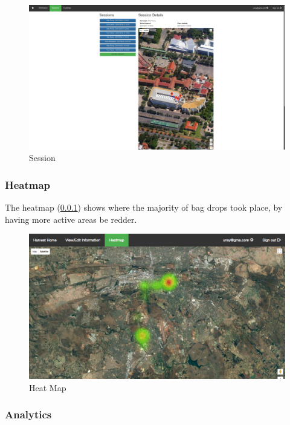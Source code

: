 \documentclass[11pt]{article}
\begin{document}
\begin{figure}
 \centering
 \includegraphics[width=12cm, keepaspectratio]{Images/webSession.png}
 \caption{Session}
 \label{webSession}
\end{figure}

\subsubsection{Heatmap}
\label{webHeatmap}

The heatmap (\ref{webHeatmap}) shows where the majority of bag drops took place, by having more active areas be redder.

\begin{figure}
 \centering
 \includegraphics[width=12cm, keepaspectratio]{Images/webHeatMap.png}
 \caption{Heat Map}
 \label{HeatMap}
\end{figure}

\subsubsection{Analytics}
\label{webAnalytics}
\end{document}
